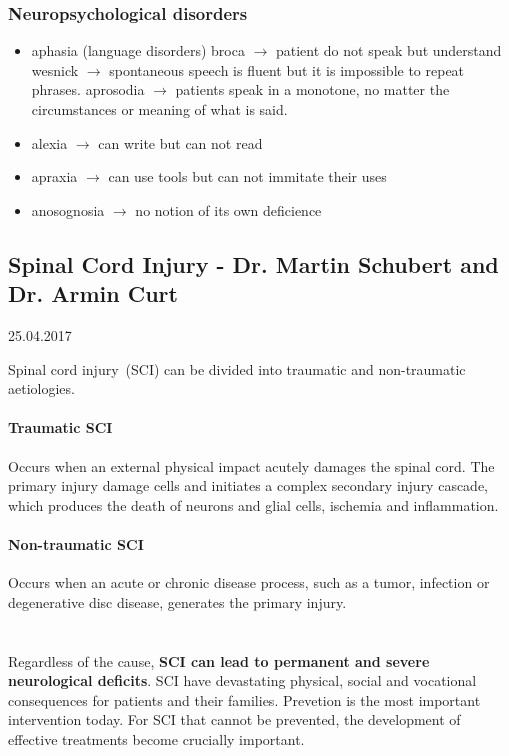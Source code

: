 \documentclass[12pt,article,oneside,a4paper]{memoir}
\begin{document}
\subsubsection{Neuropsychological disorders }
\begin{itemize}
\item aphasia (language disorders)
\subitem broca $\rightarrow$ patient do not speak but understand
\subitem wesnick $\rightarrow$ spontaneous speech is fluent but it is
impossible to repeat phrases.
\subitem aprosodia $\rightarrow$ patients speak in a monotone, no matter the
circumstances or meaning of what is said.
\item alexia $\rightarrow$ can write but can not read
\item apraxia $\rightarrow$ can use tools but can not immitate their uses
\item anosognosia $\rightarrow$ no notion of its own deficience
\end{itemize}

\newpage
\subsection{Spinal Cord Injury - Dr. Martin Schubert and Dr. Armin Curt}
25.04.2017

Spinal cord injury~(SCI) can be divided into traumatic and non-traumatic
aetiologies.

\paragraph{Traumatic SCI}
Occurs when an external physical impact acutely damages the spinal cord. The
primary injury damage cells and initiates a complex secondary injury cascade,
which produces the death of neurons and glial cells, ischemia and inflammation.

\paragraph{Non-traumatic SCI}
Occurs when an acute or chronic disease process, such as a tumor, infection or
degenerative disc disease, generates the primary injury.
\\
\\
\\
Regardless of the cause, \textbf{SCI can lead to permanent and severe
neurological deficits}. SCI have devastating physical, social and vocational
consequences for patients and their families. Prevetion is the most important
intervention today. For SCI that cannot be prevented, the development of
effective treatments become crucially important.
\end{document}
